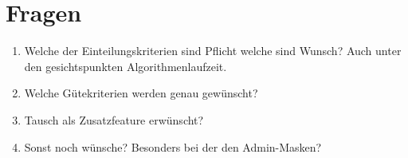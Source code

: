 \documentclass[parskip=full]{scrartcl}
\begin{document}
\section{Fragen}
\begin{enumerate}
  \item Welche der Einteilungskriterien sind Pflicht welche sind Wunsch? Auch
  unter den gesichtspunkten Algorithmenlaufzeit.

  \item Welche Gütekriterien werden genau gewünscht?
  \item Tausch als Zusatzfeature erwünscht?

  
  
  
  \item Sonst noch wünsche? Besonders bei der den Admin-Masken?
\end{enumerate}
\end{document}
